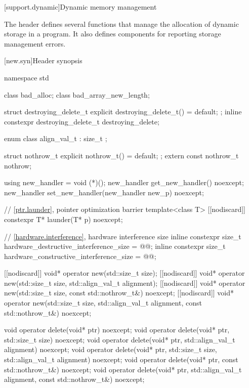 
[support.dynamic]{Dynamic memory management}

\pnum
The header
defines several
functions that manage the allocation of dynamic storage in a program.
It also defines components for reporting storage management errors.

[new.syn]{Header  synopsis}
%
%
%
%
%
%
\begin{codeblock}
namespace std {
  class bad_alloc;
  class bad_array_new_length;

  struct destroying_delete_t {
    explicit destroying_delete_t() = default;
  };
  inline constexpr destroying_delete_t destroying_delete{};

  enum class align_val_t : size_t {};

  struct nothrow_t { explicit nothrow_t() = default; };
  extern const nothrow_t nothrow;

  using new_handler = void (*)();
  new_handler get_new_handler() noexcept;
  new_handler set_new_handler(new_handler new_p) noexcept;

  // \ref{ptr.launder}, pointer optimization barrier
  template<class T> [[nodiscard]] constexpr T* launder(T* p) noexcept;

  // \ref{hardware.interference}, hardware interference size
  inline constexpr size_t hardware_destructive_interference_size = @\impdef{}@;
  inline constexpr size_t hardware_constructive_interference_size = @\impdef{}@;
}

[[nodiscard]] void* operator new(std::size_t size);
[[nodiscard]] void* operator new(std::size_t size, std::align_val_t alignment);
[[nodiscard]] void* operator new(std::size_t size, const std::nothrow_t&) noexcept;
[[nodiscard]] void* operator new(std::size_t size, std::align_val_t alignment,
                                 const std::nothrow_t&) noexcept;

void  operator delete(void* ptr) noexcept;
void  operator delete(void* ptr, std::size_t size) noexcept;
void  operator delete(void* ptr, std::align_val_t alignment) noexcept;
void  operator delete(void* ptr, std::size_t size, std::align_val_t alignment) noexcept;
void  operator delete(void* ptr, const std::nothrow_t&) noexcept;
void  operator delete(void* ptr, std::align_val_t alignment, const std::nothrow_t&) noexcept;


\end{codeblock}
